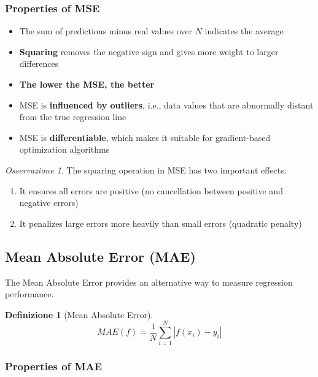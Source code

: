 \documentclass[11pt,a4paper]{article}
\theoremstyle{definition}
\newtheorem{definition}{Definizione}[section]
\theoremstyle{plain}
\theoremstyle{remark}
\newtheorem*{observation}{Osservazione}
\begin{document}
\subsubsection{Properties of MSE}

\begin{itemize}
    \item The sum of predictions minus real values over $N$ indicates the average
    \item \textbf{Squaring} removes the negative sign and gives more weight to larger differences
    \item \textbf{The lower the MSE, the better}
    \item MSE is \textbf{influenced by outliers}, i.e., data values that are abnormally distant from the true regression line
    \item MSE is \textbf{differentiable}, which makes it suitable for gradient-based optimization algorithms
\end{itemize}

\begin{observation}
The squaring operation in MSE has two important effects:
\begin{enumerate}
    \item It ensures all errors are positive (no cancellation between positive and negative errors)
    \item It penalizes large errors more heavily than small errors (quadratic penalty)
\end{enumerate}
\end{observation}

\subsection{Mean Absolute Error (MAE)}

The Mean Absolute Error provides an alternative way to measure regression performance.

\begin{definition}[Mean Absolute Error]
\begin{equation}
MAE(f) = \frac{1}{N} \sum_{i=1}^{N} |f(x_i) - y_i|
\end{equation}
\end{definition}

\subsubsection{Properties of MAE}
\end{document}
